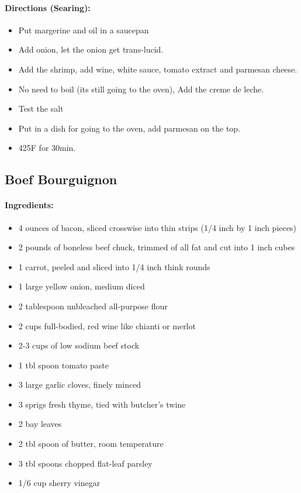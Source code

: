 \documentclass{article}
\begin{document}
\paragraph{Directions (Searing):}
\begin{itemize}
	\item Put margerine and oil in a saucepan
	\item Add onion, let the onion get trans-lucid.
	\item Add the shrimp, add wine, white sauce, tomato extract and parmesan cheese.
	\item No need to boil (its still going to the oven), Add the creme de leche.
	\item Test the salt
	\item Put in a dish for going to the oven, add parmesan on the top.
	\item 425F for 30min.
\end{itemize}

\subsection{Boef Bourguignon}

\paragraph{Ingredients:}

\begin{itemize}
	\item 4 ounces of bacon, sliced crosswise into thin strips (1/4 inch by 1 inch pieces)
	\item 2 pounds of boneless beef chuck, trimmed of all fat and cut into 1 inch cubes
	\item 1 carrot, peeled and sliced into 1/4 inch think rounds
	\item 1 large yellow onion, medium diced
	\item 2 tablespoon unbleached all-purpose flour
	\item 2 cups full-bodied, red wine like chianti or merlot
	\item 2-3 cups of low sodium beef stock
	\item 1 tbl spoon tomato paste
	\item 3 large garlic cloves, finely minced
	\item 3 sprigs fresh thyme, tied with butcher's twine
	\item 2 bay leaves
	\item 2 tbl spoon of butter, room temperature
	\item 3 tbl spoons chopped flat-leaf parsley
	\item 1/6 cup sherry vinegar
\end{itemize}
\end{document}
